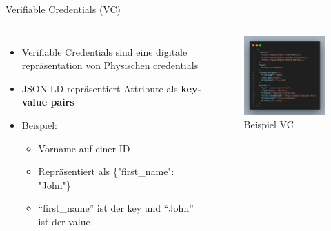 \documentclass[
	german,%
	authorontitle=true,
	]{bfhbeamer}
\begin{document}
\begin{frame}{Verifiable Credentials (VC)}
    \begin{columns}[onlytextwidth,T]
        \column{70mm}  

    \begin{itemize}
        \item Verifiable Credentials sind eine digitale repräsentation von Physischen credentials
        \item JSON-LD repräsentiert Attribute als \textbf{key-value pairs}
        \item Beispiel:
        \begin{itemize}
            \item Vorname auf einer ID
            \item Repräsentiert als \{"first\_name": "John"\}
            \item ``first\_name'' ist der key und ``John'' ist der value
        \end{itemize}
    \end{itemize}

    \column{70mm}
    \begin{figure}
        \centering
        \includegraphics[width=60mm]{../img/VCSignExample.png}
        \caption{Beispiel VC}
    \end{figure}

    \end{columns}
\end{frame}
\end{document}
